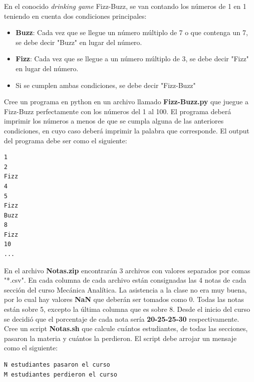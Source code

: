 \documentclass[11pt,letterpaper]{exam}
\begin{document}
\begin{questions}


En el conocido \textit{drinking game} Fizz-Buzz, se van contando los n\'umeros de 1 en 1 teniendo en cuenta dos condiciones principales:

\begin{itemize}
\item \textbf{Buzz}: Cada vez que se llegue un n\'umero m\'ultiplo de 7 o que contenga un 7, se debe decir "Buzz" en lugar del n\'umero.
\item \textbf{Fizz}: Cada vez que se llegue a un n\'umero m\'ultiplo de 3, se debe decir "Fizz" en lugar del n\'umero.
\item Si se cumplen ambas condiciones, se debe decir "Fizz-Buzz" 
\end{itemize}

Cree un programa en python en un archivo llamado \textbf{Fizz-Buzz.py} que juegue a Fizz-Buzz perfectamente con los n\'umeros del 1 al 100. El programa deber\'a imprimir los n\'umeros a menos de que se cumpla alguna de las anteriores condiciones, en cuyo caso deber\'a imprimir la palabra que corresponde. El output del programa debe ser como el siguiente:

\begin{verbatim}
1
2
Fizz
4
5
Fizz
Buzz
8
Fizz
10
...
\end{verbatim}


En el archivo \textbf{Notas.zip} encontrar\'an 3 archivos con valores separados por comas "*.csv". En cada columna de cada archivo est\'an consignadas las 4 notas de cada secci\'on del curso Mec\'anica Anal\'itica. La asistencia a la clase no era muy buena, por lo cual hay valores \textbf{NaN} que deber\'an ser tomados como 0. Todas las notas est\'an sobre 5, excepto la \'ultima columna que es sobre 8. Desde el inicio del curso se decidi\'o que el porcentaje de cada nota ser\'ia \textbf{20-25-25-30} respectivamente. \\

Cree un script \textbf{Notas.sh} que calcule cu\'antos estudiantes, de todas las secciones, pasaron la materia y cu\'antos la perdieron. El script  debe arrojar un mensaje como el siguiente:

\begin{verbatim}
N estudiantes pasaron el curso
M estudiantes perdieron el curso
\end{verbatim}


\end{questions}
\end{document}
